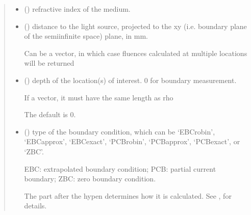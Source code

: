 \documentclass[letterpaper,10pt,english]{sphinxmanual}
\begin{document}
\begin{fulllineitems}
\begin{quote}
\begin{description}
\begin{itemize}
\item {} 
\sphinxAtStartPar
{} () \textendash{} refractive index of the medium.

\item {} 
\sphinxAtStartPar
{} () \textendash{} 
\sphinxAtStartPar
distance to the light source, projected to the x\sphinxhyphen{}y (i.e. boundary plane of the semi\sphinxhyphen{}infinite space) plane, in mm.

\sphinxAtStartPar
Can be a vector, in which case fluences calculated at multiple locations will be returned


\item {} 
\sphinxAtStartPar
{} (\sphinxstyleliteralemphasis{\sphinxupquote{, }}) \textendash{} 
\sphinxAtStartPar
depth of the location(s) of interest. 0 for boundary measurement.

\sphinxAtStartPar
If a vector, it must have the same length as rho

\sphinxAtStartPar
The default is 0.


\item {} 
\sphinxAtStartPar
{} (\sphinxstyleliteralemphasis{\sphinxupquote{, }}) \textendash{} 
\sphinxAtStartPar
type of the boundary condition, which can be ‘EBC\sphinxhyphen{}robin’, ‘EBC\sphinxhyphen{}approx’, ‘EBC\sphinxhyphen{}exact’, ‘PCB\sphinxhyphen{}robin’, ‘PCB\sphinxhyphen{}approx’, ‘PCB\sphinxhyphen{}exact’, or ‘ZBC’.

\sphinxAtStartPar
EBC: extrapolated boundary condition; PCB: partial current boundary; ZBC: zero boundary condition.

\sphinxAtStartPar
The part after the hypen determines how it is calculated.
See {\hyperref[\detokenize{_autosummary/nirfasterff.utils.boundary_attenuation:nirfasterff.utils.boundary_attenuation}]{}},  for details.


\end{itemize}
\end{description}
\end{quote}
\end{fulllineitems}
\end{document}
